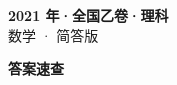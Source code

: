 \documentclass[zihao=-4, a4paper]{ctexart}
\begin{document}
\begin{center}
  {\Large\bfseries 2021 年·全国乙卷·理科}\\[4pt]
  {\large 数学 · 简答版}
\end{center}
\medskip
{}

\clearpage
{}
\begin{center}{\Large\bfseries 答案速查}\end{center}
\medskip

\end{document}
